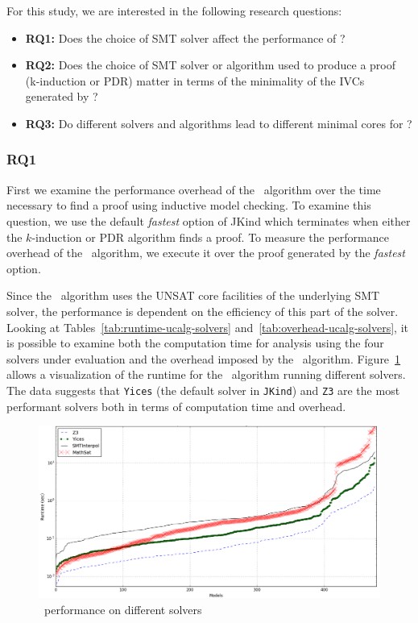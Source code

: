 For this study, we are interested in the following research questions:
\begin{itemize}
  \item \textbf{RQ1:} Does the choice of SMT solver affect the performance of \ucalg ?
  \item \textbf{RQ2:} Does the choice of SMT solver or algorithm used to produce a proof
(k-induction or PDR) matter in terms of the minimality of the IVCs generated by \ucalg ?
  \item \textbf{RQ3:} Do different solvers and algorithms
lead to different minimal cores for \ucalg ?
\end{itemize}

\vspace{0.1in}
\subsubsection{RQ1}
First we examine the performance overhead of the \ucalg\ algorithm over the time necessary to find a proof using inductive model checking.  To examine this question, we use the default {\em fastest} option of JKind which terminates when either the $k$-induction or PDR algorithm finds a proof.  To measure the performance overhead of the \ucalg\ algorithm, we execute it over the proof generated by the {\em fastest} option.

Since the \ucalg\ algorithm uses the UNSAT core facilities of the
underlying SMT solver, the performance is dependent on the efficiency
of this part of the solver. Looking at Tables~\ref{tab:runtime-ucalg-solvers}
and~\ref{tab:overhead-ucalg-solvers}, it is possible to examine both the
computation time for analysis using the four solvers under evaluation
and the overhead imposed by the \ucalg\ algorithm.
Figure~\ref{fig:perf-solvers} allows a visualization of the runtime for
the \ucalg\ algorithm running different solvers. The data suggests that
\texttt{Yices} (the default solver in \texttt{JKind}) and \texttt{Z3} are the most performant
solvers both in terms of computation time and overhead.

\begin{figure}
  \centering
  \includegraphics[width=\textwidth]{figs/performance_solvers.png}
    \vspace{-0.1in}
  \caption{\ucalg\ performance on different solvers} 
  \label{fig:perf-solvers}
\end{figure}

